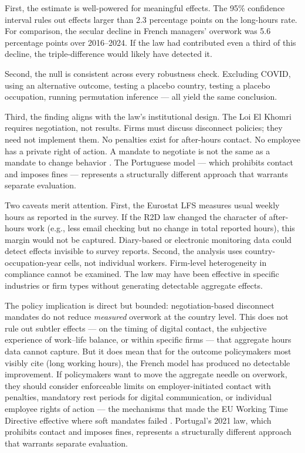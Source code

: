 \documentclass[12pt]{article}
\begin{document}
First, the estimate is well-powered for meaningful effects. The 95\% confidence interval rules out effects larger than 2.3 percentage points on the long-hours rate. For comparison, the secular decline in French managers' overwork was 5.6 percentage points over 2016--2024. If the law had contributed even a third of this decline, the triple-difference would likely have detected it.

Second, the null is consistent across every robustness check. Excluding COVID, using an alternative outcome, testing a placebo country, testing a placebo occupation, running permutation inference --- all yield the same conclusion.

Third, the finding aligns with the law's institutional design. The Loi El Khomri requires negotiation, not results. Firms must discuss disconnect policies; they need not implement them. No penalties exist for after-hours contact. No employee has a private right of action. A mandate to negotiate is not the same as a mandate to change behavior \citep{bell2003consequences}. The Portuguese model --- which prohibits contact and imposes fines --- represents a structurally different approach that warrants separate evaluation.

Two caveats merit attention. First, the Eurostat LFS measures usual weekly hours as reported in the survey. If the R2D law changed the character of after-hours work (e.g., less email checking but no change in total reported hours), this margin would not be captured. Diary-based or electronic monitoring data could detect effects invisible to survey reports. Second, the analysis uses country-occupation-year cells, not individual workers. Firm-level heterogeneity in compliance cannot be examined. The law may have been effective in specific industries or firm types without generating detectable aggregate effects.

The policy implication is direct but bounded: negotiation-based disconnect mandates do not reduce \textit{measured} overwork at the country level. This does not rule out subtler effects --- on the timing of digital contact, the subjective experience of work--life balance, or within specific firms --- that aggregate hours data cannot capture. But it does mean that for the outcome policymakers most visibly cite (long working hours), the French model has produced no detectable improvement. If policymakers want to move the aggregate needle on overwork, they should consider enforceable limits on employer-initiated contact with penalties, mandatory rest periods for digital communication, or individual employee rights of action --- the mechanisms that made the EU Working Time Directive effective where soft mandates failed \citep{barnard2012eu}. Portugal's 2021 law, which prohibits contact and imposes fines, represents a structurally different approach that warrants separate evaluation.
\end{document}
